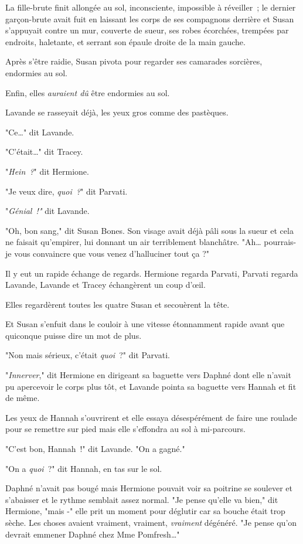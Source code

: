 La fille-brute finit allongée au sol, inconsciente, impossible à réveiller~; le dernier garçon-brute avait fuit en laissant les corps de ses compagnons derrière et Susan s'appuyait contre un mur, couverte de sueur, ses robes écorchées, trempées par endroits, haletante, et serrant son épaule droite de la main gauche.

Après s'être raidie, Susan pivota pour regarder ses camarades sorcières, endormies au sol.

Enfin, elles \emph{auraient dû} être endormies au sol.

Lavande se rasseyait déjà, les yeux gros comme des pastèques.

"Ce…" dit Lavande.

"C'était…" dit Tracey.

"\emph{Hein~?}" dit Hermione.

"Je veux dire, \emph{quoi~?}" dit Parvati.

"\emph{Génial~!"} dit Lavande.

"Oh, bon sang," dit Susan Bones. Son visage avait déjà pâli sous la sueur et cela ne faisait qu'empirer, lui donnant un air terriblement blanchâtre. "Ah… pourrais-je vous convaincre que vous venez d'halluciner tout ça ?"

Il y eut un rapide échange de regards. Hermione regarda Parvati, Parvati regarda Lavande, Lavande et Tracey échangèrent un coup d'œil.

Elles regardèrent toutes les quatre Susan et secouèrent la tête.

Et Susan s'enfuit dans le couloir à une vitesse étonnamment rapide avant que quiconque puisse dire un mot de plus.

"Non mais sérieux, c'était \emph{quoi}~?" dit Parvati.

"\emph{Innerver}," dit Hermione en dirigeant sa baguette vers Daphné dont elle n'avait pu apercevoir le corps plus tôt, et Lavande pointa sa baguette vers Hannah et fit de même.

Les yeux de Hannah s'ouvrirent et elle essaya désespérément de faire une roulade pour se remettre sur pied mais elle s'effondra au sol à mi-parcours.

"C'est bon, Hannah~!" dit Lavande. "On a gagné."

"On a \emph{quoi}~?" dit Hannah, en tas sur le sol.

Daphné n'avait pas bougé mais Hermione pouvait voir sa poitrine se soulever et s'abaisser et le rythme semblait assez normal. "Je pense qu'elle va bien," dit Hermione, "mais -" elle prit un moment pour déglutir car sa bouche était trop sèche. Les choses avaient vraiment, vraiment, \emph{vraiment} dégénéré. "Je pense qu'on devrait emmener Daphné chez Mme Pomfresh…"

